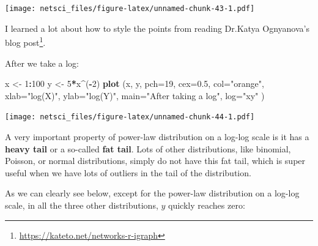 \documentclass[
]{krantz}
\makeatletter
\newenvironment{Shaded}{\begin{snugshade}}{\end{snugshade}}
\newcommand{\DataTypeTok}[1]{\textcolor[rgb]{0.27,0.27,0.27}{#1}}
\newcommand{\DecValTok}[1]{\textcolor[rgb]{0.06,0.06,0.06}{#1}}
\newcommand{\FloatTok}[1]{\textcolor[rgb]{0.06,0.06,0.06}{#1}}
\newcommand{\KeywordTok}[1]{\textcolor[rgb]{0.27,0.27,0.27}{\textbf{#1}}}
\newcommand{\NormalTok}[1]{#1}
\newcommand{\OperatorTok}[1]{\textcolor[rgb]{0.43,0.43,0.43}{\textbf{#1}}}
\newcommand{\StringTok}[1]{\textcolor[rgb]{0.5,0.5,0.5}{#1}}
\renewcommand{\href}[2]{#2\footnote{\url{#1}}}
\newenvironment{kframe}{%
\medskip{}
\setlength{\fboxsep}{.8em}
 \def\at@end@of@kframe{}%
 \ifinner\ifhmode%
  \def\at@end@of@kframe{\end{minipage}}%
  \begin{minipage}{\columnwidth}%
 \fi\fi%
 \def\FrameCommand##1{\hskip\@totalleftmargin \hskip-\fboxsep
 \colorbox{shadecolor}{##1}\hskip-\fboxsep
     \hskip-\linewidth \hskip-\@totalleftmargin \hskip\columnwidth}%
 \MakeFramed {\advance\hsize-\width
   \@totalleftmargin\z@ \linewidth\hsize
   \@setminipage}}%
 {\par\unskip\endMakeFramed%
 \at@end@of@kframe}
\renewenvironment{Shaded}{\begin{kframe}}{\end{kframe}}
\makeatother
\begin{document}
\texttt{[image: netsci\_files/figure-latex/unnamed-chunk-43-1.pdf]}

I learned a lot about how to style the points from reading \href{https://kateto.net/networks-r-igraph}{Dr.Katya Ognyanova's blog post}.

After we take a log:

\begin{Shaded}
\begin{Highlighting}[]
\NormalTok{x <-}\StringTok{ }\DecValTok{1}\OperatorTok{:}\DecValTok{100}
\NormalTok{y <-}\StringTok{ }\DecValTok{5}\OperatorTok{*}\NormalTok{x}\OperatorTok{^}\NormalTok{(}\OperatorTok{-}\DecValTok{2}\NormalTok{)}
\KeywordTok{plot}\NormalTok{ (x, y, }\DataTypeTok{pch=}\DecValTok{19}\NormalTok{, }\DataTypeTok{cex=}\FloatTok{0.5}\NormalTok{, }\DataTypeTok{col=}\StringTok{"orange"}\NormalTok{,}
      \DataTypeTok{xlab=}\StringTok{"log(X)"}\NormalTok{, }\DataTypeTok{ylab=}\StringTok{"log(Y)"}\NormalTok{,}
      \DataTypeTok{main=}\StringTok{"After taking a log"}\NormalTok{,}
      \DataTypeTok{log=}\StringTok{"xy"}
\NormalTok{      )}
\end{Highlighting}
\end{Shaded}

\texttt{[image: netsci\_files/figure-latex/unnamed-chunk-44-1.pdf]}

A very important property of power-law distribution on a log-log scale is it has a \textbf{heavy tail} or a so-called \textbf{fat tail}. Lots of other distributions, like binomial, Poisson, or normal distributions, simply do not have this fat tail, which is super useful when we have lots of outliers in the tail of the distribution.

As we can clearly see below, except for the power-law distribution on a log-log scale, in all the three other distributions, \(y\) quickly reaches zero:
\end{document}
